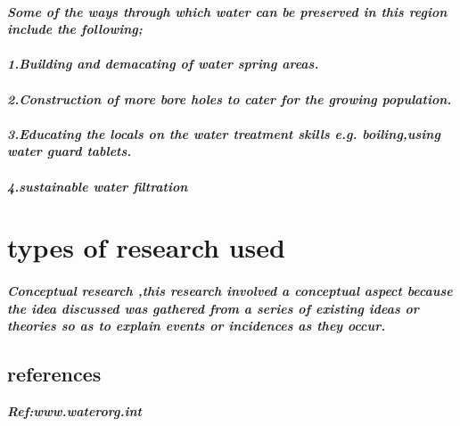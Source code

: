 \documentclass[a4paper,12pt]{article}
\begin{document}
\paragraph{\sl Some of the ways through which water can be preserved in this region include the following;}
\paragraph{\sl 1.Building and demacating of water spring areas.}
\paragraph{\sl 2.Construction of more bore holes to cater for the growing population.}
\paragraph{\sl 3.Educating the locals on the water treatment skills e.g. boiling,using water guard tablets.}
\paragraph{\sl 4.sustainable water filtration
}


\section{\sc types of research used}
\paragraph{\sl Conceptual research ,this research involved a conceptual aspect  because  the idea discussed was gathered from a series of  existing ideas or theories so as to explain events or incidences as they occur.}
\subsection{\sc references}

\textbf{\sl 	
Ref:www.waterorg.int
}
\end{document}
